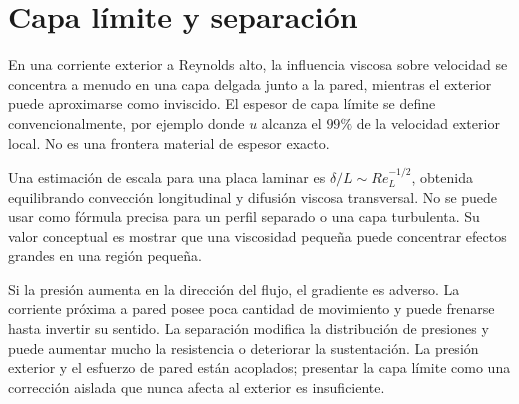 \section{Capa límite y separación}
En una corriente exterior a Reynolds alto, la influencia viscosa sobre velocidad se concentra a menudo en una capa delgada junto a la pared, mientras el exterior puede aproximarse como inviscido. El espesor de capa límite se define convencionalmente, por ejemplo donde $u$ alcanza el $99\%$ de la velocidad exterior local. No es una frontera material de espesor exacto.

Una estimación de escala para una placa laminar es $\delta/L\sim Re_L^{-1/2}$, obtenida equilibrando convección longitudinal y difusión viscosa transversal. No se puede usar como fórmula precisa para un perfil separado o una capa turbulenta. Su valor conceptual es mostrar que una viscosidad pequeña puede concentrar efectos grandes en una región pequeña.

Si la presión aumenta en la dirección del flujo, el gradiente es adverso. La corriente próxima a pared posee poca cantidad de movimiento y puede frenarse hasta invertir su sentido. La separación modifica la distribución de presiones y puede aumentar mucho la resistencia o deteriorar la sustentación. La presión exterior y el esfuerzo de pared están acoplados; presentar la capa límite como una corrección aislada que nunca afecta al exterior es insuficiente.


